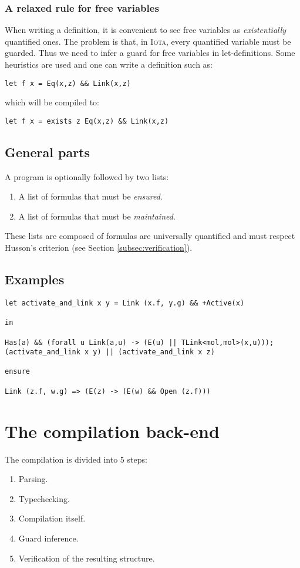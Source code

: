 \documentclass[10pt,a4paper]{article}
\newcommand\Iota{\textsc{Iota}}
\begin{document}
\subsubsection{A relaxed rule for free variables}
When writing a definition, it is convenient to see free variables as \emph{existentially} quantified ones. The problem is that, in \Iota{}, every quantified variable must be guarded. Thus we need to infer a guard for free variables in let-definitions. Some heuristics are used and one can write a definition such as:
\begin{verbatim}
let f x = Eq(x,z) && Link(x,z)
\end{verbatim}
which will be compiled to:
\begin{verbatim}
let f x = exists z Eq(x,z) && Link(x,z)
\end{verbatim}

\subsection{General parts}
A program is optionally followed by two lists:
\begin{enumerate}
\item A list of formulas that must be \emph{ensured}.
\item A list of formulas that must be \emph{maintained}.
\end{enumerate}

These lists are composed of formulas are universally quantified and must respect Husson's criterion (see Section \ref{subsec:verification}).

\subsection{Examples}
\label{configex}
\begin{verbatim}
let activate_and_link x y = Link (x.f, y.g) && +Active(x)

in

Has(a) && (forall u Link(a,u) -> (E(u) || TLink<mol,mol>(x,u)));
(activate_and_link x y) || (activate_and_link x z)

ensure

Link (z.f, w.g) => (E(z) -> (E(w) && Open (z.f)))
\end{verbatim}


\section{The compilation back-end}
The compilation is divided into 5 steps:
\begin{enumerate}
\item Parsing.
\item Typechecking.
\item Compilation itself.
\item Guard inference.
\item Verification of the resulting structure.
\end{enumerate}
\end{document}
